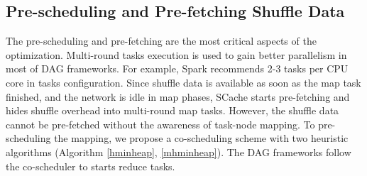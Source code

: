 {\color{blue}
\subsection{Pre-scheduling and Pre-fetching Shuffle Data}
The pre-scheduling and pre-fetching are the most critical aspects of the optimization.
Multi-round tasks execution is used to gain better parallelism in most of DAG frameworks. For example, Spark recommends 2-3 tasks per CPU core in tasks configuration.
Since shuffle data is available as soon as the map task finished, and the network is idle in map phases, 
SCache starts pre-fetching and hides shuffle overhead into multi-round map tasks.
However, the shuffle data cannot be pre-fetched without the awareness of task-node mapping.
To pre-scheduling the mapping, we propose a co-scheduling scheme with two heuristic algorithms (Algorithm \ref{hminheap}, \ref{mhminheap}). 
The DAG frameworks follow the co-scheduler to starts reduce tasks.
}

